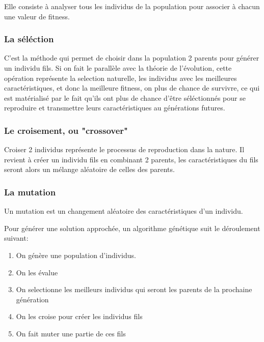 \documentclass[11pt]{article}
\begin{document}
Elle consiste à analyser tous les individus de la population pour associer à chacun une valeur de fitness.

\subsubsection{La séléction}
\label{sec-1-2-5}

C'est la méthode qui permet de choisir dans la population 2 parents pour générer un individu fils.
Si on fait le parallèle avec la théorie de l'évolution, cette opération représente la selection naturelle,
les individus avec les meilleures caractéristiques, et donc la meilleure fitness, on plus de chance de survivre,
ce qui est matérialisé par le fait qu'ils ont plus de chance d'être séléctionnés pour se reproduire et transmettre
leurs caractéristiques au générations futures.

\subsubsection{Le croisement, ou "crossover"}
\label{sec-1-2-6}

Croiser 2 individus représente le processus de reproduction dans la nature. Il revient à créer un individu fils
en combinant 2 parents, les caractéristiques du fils seront alors un mélange aléatoire de celles des parents.

\subsubsection{La mutation}
\label{sec-1-2-7}

Un mutation est un changement aléatoire des caractéristiques d'un individu. 

Pour générer une solution approchée, un algorithme génétique suit le déroulement suivant:

\begin{enumerate}
\item On génère une population d'individus.
\item On les évalue
\item On selectionne les meilleurs individus qui seront les parents de la prochaine génération
\item On les croise pour créer les individus fils
\item On fait muter une partie de ces fils
\end{enumerate}
\end{document}
